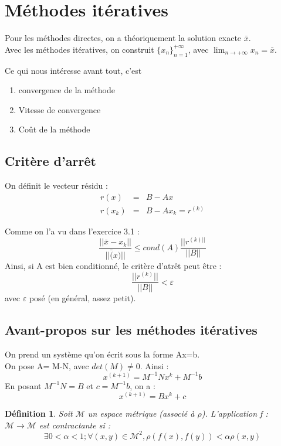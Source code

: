 \documentclass{article}
\theoremstyle{mes_theoremes}
\newtheorem*{Def}{Définition}
\begin{document}
\section{Méthodes itératives}
Pour les méthodes directes, on a théoriquement la solution exacte $\bar{x}$. \\
Avec les méthodes itératives, on construit $\{x_n\}_{n=1}^{+\infty}$, avec $\lim_{n\rightarrow +\infty} x_n = \bar{x}$.

Ce qui nous intéresse avant tout, c'est
\begin{enumerate}
\item convergence de la méthode
\item Vitesse de convergence
\item Coût de la méthode
\end{enumerate}

\subsection{Critère d'arrêt}
On définit le vecteur résidu :
\begin{eqnarray*}
r(x) &=& B-Ax \\
r(x_k) &=& B-Ax_k = r^{(k)}
\end{eqnarray*}

Comme on l'a vu dans l'exercice 3.1 : \[\frac{||\bar{x} - x_k||}{||\bar(x)||} \leq cond(A) \frac{||r^{(k)||}}{||B||}\]
Ainsi, si A est bien conditionné, le critère d'atrêt peut être :  \[ \frac{||r^{(k)}||}{||B||} < \varepsilon \] avec $\varepsilon$ posé (en général, assez petit).

\subsection{Avant-propos sur les méthodes itératives}
On prend un système qu'on écrit sous la forme Ax=b. \\
On pose A= M-N, avec $det(M) \neq 0$. Ainsi : \[x^{(k+1)} = M^{-1}N x^k + M^{-1}b\]
En posant $M^{-1}N=B$ et $c=M^{-1}b$, on a : \begin{equation} x^{(k+1)} = B x^k + c \end{equation}

\begin{Def}
Soit $\mathcal{M}$ un espace métrique (associé à $\rho$). L'application f : $\mathcal{M} \rightarrow \mathcal{M}$ est contractante si : \[\exists 0<\alpha<1; \forall(x,y)\in \mathcal{M}^2, \rho (f(x),f(y)) < \alpha \rho(x,y)\]
\end{Def}
\end{document}
